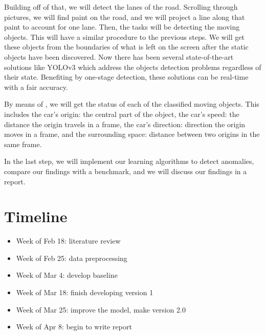 \documentclass[10pt,twocolumn,letterpaper]{article}
\begin{document}
Building off of that, we will detect the lanes of the road. Scrolling through pictures, we will find paint on the road, and we will project a line along that paint to account for one lane. Then, the tasks will be detecting the moving objects. This will have a similar procedure to the previous steps. We will get these objects from the boundaries of what is left on the screen after the static objects have been discovered.
Now there has been several state-of-the-art solutions like YOLOv3\cite{redmon2018yolov3} which address the objects detection problems regardless of their state. Benefiting by one-stage detection, these solutions can be real-time with a fair accuracy.

By means of \cite{mahadevan2010anomaly}, we will get the status of each of the classified moving objects. This includes the car's origin: the central part of the object, the car's speed: the distance the origin travels in a frame, the car's direction: direction the origin moves in a frame, and the surrounding space: distance between two origins in the same frame.

In the last step, we will implement our learning algorithms to detect anomalies, compare our findings with a benchmark, and we will discuss our findings in a report.

\section{Timeline}
\begin{itemize}[itemsep=-5pt]
    \item  Week of Feb 18: literature review
    \item  Week of Feb 25: data preprocessing
    \item  Week of Mar 4: develop baseline
    \item  Week of Mar 18: finish developing version 1
    \item  Week of Mar 25: improve the model, make version 2.0
    \item  Week of Apr 8: begin to write report
\end{itemize}

{\small


}
\end{document}
